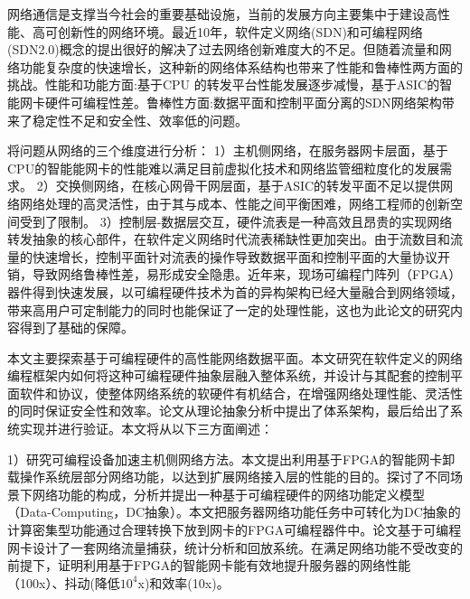 
\setcounter{page}{1}

%
%
%

网络通信是支撑当今社会的重要基础设施，当前的发展方向主要集中于建设高性能、高可创新性的网络环境。最近10年，软件定义网络(SDN)和可编程网络(SDN2.0)概念的提出很好的解决了过去网络创新难度大的不足。但随着流量和网络功能复杂度的快速增长，这种新的网络体系结构也带来了性能和鲁棒性两方面的挑战。性能和功能方面:基于CPU 的转发平台性能发展逐步减慢，基于ASIC的智能网卡硬件可编程性差。鲁棒性方面:数据平面和控制平面分离的SDN网络架构带来了稳定性不足和安全性、效率低的问题。

将问题从网络的三个维度进行分析：
1）主机侧网络，在服务器网卡层面，基于CPU的智能能网卡的性能难以满足目前虚拟化技术和网络监管细粒度化的发展需求。
2）交换侧网络，在核心网骨干网层面，基于ASIC的转发平面不足以提供网络网络处理的高灵活性，由于其与成本、性能之间平衡困难，网络工程师的创新空间受到了限制。
3）控制层-数据层交互，硬件流表是一种高效且昂贵的实现网络转发抽象的核心部件，在软件定义网络时代流表稀缺性更加突出。由于流数目和流量的快速增长，控制平面针对流表的操作导致数据平面和控制平面的大量协议开销，导致网络鲁棒性差，易形成安全隐患。近年来，现场可编程门阵列（FPGA）器件得到快速发展，以可编程硬件技术为首的异构架构已经大量融合到网络领域，带来高用户可定制能力的同时也能保证了一定的处理性能，这也为此论文的研究内容得到了基础的保障。

本文主要探索基于可编程硬件的高性能网络数据平面。本文研究在软件定义的网络编程框架内如何将这种可编程硬件抽象层融入整体系统，并设计与其配套的控制平面软件和协议，使整体网络系统的软硬件有机结合，在增强网络处理性能、灵活性的同时保证安全性和效率。论文从理论抽象分析中提出了体系架构，最后给出了系统实现并进行验证。本文将从以下三方面阐述：

1）研究可编程设备加速主机侧网络方法。本文提出利用基于FPGA的智能网卡卸载操作系统层部分网络功能，以达到扩展网络接入层的性能的目的。探讨了不同场景下网络功能的构成，分析并提出一种基于可编程硬件的网络功能定义模型（Data-Computing，DC抽象）。本文把服务器网络功能任务中可转化为DC抽象的计算密集型功能通过合理转换下放到网卡的FPGA可编程器件中。论文基于可编程网卡设计了一套网络流量捕获，统计分析和回放系统。在满足网络功能不受改变的前提下，证明利用基于FPGA的智能网卡能有效地提升服务器的网络性能（100x）、抖动(降低$10^4$x)和效率(10x)。

